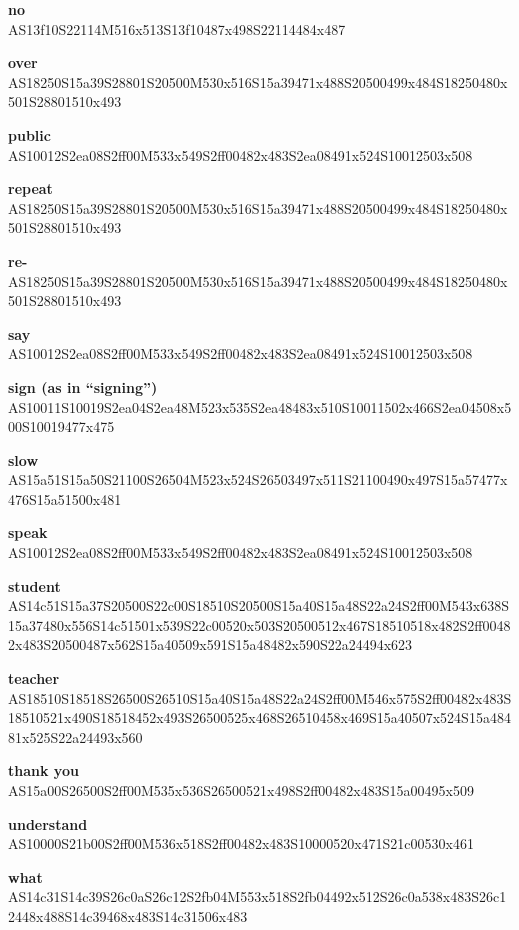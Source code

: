 \documentclass{article}
\begin{document}
\begin{glossary}
\textbf{no}\\
AS13f10S22114M516x513S13f10487x498S22114484x487

\textbf{over}\\%
AS18250S15a39S28801S20500M530x516S15a39471x488S20500499x484S18250480x501S28801510x493

\textbf{public}\\%
AS10012S2ea08S2ff00M533x549S2ff00482x483S2ea08491x524S10012503x508

\textbf{repeat}\\%
AS18250S15a39S28801S20500M530x516S15a39471x488S20500499x484S18250480x501S28801510x493

\textbf{re-}\\%
AS18250S15a39S28801S20500M530x516S15a39471x488S20500499x484S18250480x501S28801510x493

\textbf{say}\\%
AS10012S2ea08S2ff00M533x549S2ff00482x483S2ea08491x524S10012503x508

\textbf{sign (as in ``signing'')}\\
AS10011S10019S2ea04S2ea48M523x535S2ea48483x510S10011502x466S2ea04508x500S10019477x475

\textbf{slow}\\
AS15a51S15a50S21100S26504M523x524S26503497x511S21100490x497S15a57477x476S15a51500x481

\textbf{speak}\\%
AS10012S2ea08S2ff00M533x549S2ff00482x483S2ea08491x524S10012503x508

\textbf{student}\\
AS14c51S15a37S20500S22c00S18510S20500S15a40S15a48S22a24S2ff00M543x638S15a37480x556S14c51501x539S22c00520x503S20500512x467S18510518x482S2ff00482x483S20500487x562S15a40509x591S15a48482x590S22a24494x623

\textbf{teacher}\\
AS18510S18518S26500S26510S15a40S15a48S22a24S2ff00M546x575S2ff00482x483S18510521x490S18518452x493S26500525x468S26510458x469S15a40507x524S15a48481x525S22a24493x560

\textbf{thank you}\\
AS15a00S26500S2ff00M535x536S26500521x498S2ff00482x483S15a00495x509

\textbf{understand}\\
AS10000S21b00S2ff00M536x518S2ff00482x483S10000520x471S21c00530x461

\textbf{what}\\
AS14c31S14c39S26c0aS26c12S2fb04M553x518S2fb04492x512S26c0a538x483S26c12448x488S14c39468x483S14c31506x483


\end{glossary}
\end{document}
